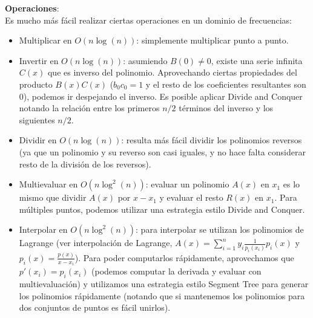 {\textbf{Operaciones}: \\
Es mucho más fácil realizar ciertas operaciones en un dominio de frecuencias:
\begin{itemize}
	\item Multiplicar en $O(n\log(n))$: simplemente multiplicar punto a punto.

    \item Invertir en $O(n\log(n))$: asumiendo $B(0) \neq 0$, existe una serie infinita $C(x)$ que es inverso del polinomio.
    Aprovechando ciertas propiedades del producto $B(x)C(x)$ ($b_0c_0 = 1$ y el resto de los coeficientes resultantes son $0$),
    podemos ir despejando el inverso. Es posible aplicar Divide and Conquer notando la relación entre los primeros $n/2$ términos
    del inverso y los siguientes $n/2$.

	\item Dividir en $O(n\log(n))$: resulta más fácil dividir los polinomios reversos (ya que un polinomio y su reverso son casi iguales,
	y no hace falta considerar resto de la división de los reversos).
	
    \item Multievaluar en $O(n\log^2(n))$: evaluar un polinomio $A(x)$ en $x_1$ es lo mismo que dividir $A(x)$ por $x - x_1$ y evaluar el resto
    $R(x)$ en $x_1$. Para múltiples puntos, podemos utilizar una estrategia estilo Divide and Conquer.

    \item Interpolar en $O(n\log^2(n))$: para interpolar se utilizan los polinomios de Lagrange (ver interpolación de Lagrange, 
    $A(x)=\sum_{i=1}^{n} y_i\frac{1}{p_i(x_i)}p_i(x)$ y $p_i(x) = \frac{p(x)}{x-x_i}$). Para poder computarlos rápidamente, aprovechamos que
    $p'(x_i)=p_i(x_i)$ (podemos computar la derivada y evaluar con multievaluación) y utilizamos una estrategia estilo Segment Tree para
    generar los polinomios rápidamente (notando que si mantenemos los polinomios para dos conjuntos de puntos es fácil unirlos).

\end{itemize}


}
